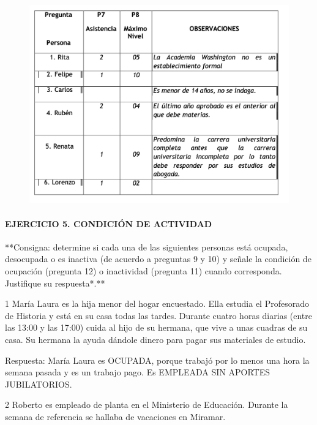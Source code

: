 \documentclass[
  openany]{book}
\begin{document}
\begin{figure}

{\centering \includegraphics[width=1\linewidth]{imagenes/figura6-149} 

}

\end{figure}

\hypertarget{ejercicio-5.-condiciuxf3n-de-actividad-1}{%
\paragraph{\texorpdfstring{\textbf{EJERCICIO 5. CONDICIÓN DE ACTIVIDAD}}{EJERCICIO 5. CONDICIÓN DE ACTIVIDAD}}\label{ejercicio-5.-condiciuxf3n-de-actividad-1}}

**Consigna: determine si cada una de las siguientes personas está ocupada, desocupada o es inactiva (de acuerdo a preguntas 9 y 10) y señale la condición de ocupación (pregunta 12) o inactividad (pregunta 11) cuando corresponda. Justifique su respuesta*.**

1 María Laura es la hija menor del hogar encuestado. Ella estudia el Profesorado de Historia y está en su casa todas las tardes. Durante cuatro horas diarias (entre las 13:00 y las 17:00) cuida al hijo de su hermana, que vive a unas cuadras de su casa. Su hermana la ayuda dándole dinero para pagar sus materiales de estudio.

Respuesta: María Laura es OCUPADA, porque trabajó por lo menos una hora la semana pasada y es un trabajo pago. Es EMPLEADA SIN APORTES JUBILATORIOS.

2 Roberto es empleado de planta en el Ministerio de Educación. Durante la semana de referencia se hallaba de vacaciones en Miramar.
\end{document}
